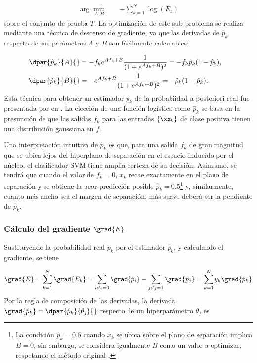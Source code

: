\begin{align}
  \arg\min_{A,B} \quad & -\sum_{k=1}^{N} \log(E_k)
  \label{abproblem}
\end{align}
sobre el conjunto de prueba $T$. La optimización de este sub-problema
se realiza mediante una técnica de descenso de gradiente, ya que las
derivadas de $\hat{p}_k$ respecto de sus parámetros $A$ y $B$ son
fácilmente calculables:

\begin{align*}
  \dpar{\hat{p}_k}{A}{}&=-f_k e^{Af_k+B}\frac{1}{(1+e^{Af_k+B})^2}
  =-f_k\hat{p}_k(1-\hat{p}_k),&\\
  \dpar{\hat{p}_k}{B}{}&=    -e^{Af_k+B}\frac{1}{(1+e^{Af_k+B})^2}
  =-   \hat{p}_k(1-\hat{p}_k).
\end{align*}
Esta técnica para obtener un estimador $p_k$ de la probabiidad a
posteriori real fue presentada por \citeauthor{platt} en \cite{platt}.
La elección de una función logística como $\hat{p}_k$ se basa en la
presunción de que las salidas $f_k$ para las entradas $\{\xx_k\}$ de
clase positiva tienen una distribución gaussiana en $f$.

Una interpretación intuitiva de $\hat{p}_k$ es que, para una salida
$f_k$ de gran magnitud que se ubica lejos del hiperplano de separación
en el espacio inducido por el núcleo, el clasificador SVM tiene amplia
certeza de su decisión.  Asimismo, se tendrá que cuando el valor de
$f_k=0$, $x_k$ recae exactamente en el plano de separación y se
obtiene la peor predicción posible $\hat{p}_k=0.5$\footnote{La
  condición $\hat{p}_k=0.5$ cuando $x_k$ se ubica sobre el plano de
  separación implica $B=0$, sin embargo, se considera igualmente $B$
  como un valor a optimizar, respetando el método original
  \cite{platt}.} y, similarmente, cuanto más ancho sea el margen de
separación, más suave deberá ser la pendiente de $\hat{p}_k$.

\subsubsection{Cálculo del gradiente $\grad{E}$}
Sustituyendo la probabilidad real $p_k$ por el estimador
$\hat{p}_k$, y calculando el gradiente, se tiene

\begin{align}
\label{gradE}
  \grad{E} = \sum_{k=1}^{N} \grad{E_k} =
  \sum_{ i:t_i=0  } \grad{\hat{p}_i}
  - \sum_{ j:t_j=1  } \grad{\hat{p}_j}
  = \sum_{k=1}^{N} y_k \grad{\hat{p}_k}
\end{align}
Por la regla de composición de las derivadas, la derivada
$\grad{\hat{p}_k}=\dpar{\hat{p}_k}{\theta_j}{}$ respecto de un
hiperparámetro ${\theta_j}$ es

